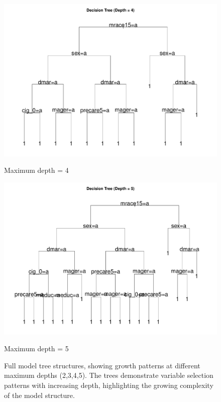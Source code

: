 \begin{figure}[p]
    \vspace{1cm}
    
    \begin{minipage}{0.48\textwidth}
        \centering
        \includegraphics[width=\linewidth]{chapters/chapter3/figures/depth/plot1/decision_tree_depth_4_2021_large.pdf}
        \caption*{Maximum depth = 4}
    \end{minipage}
    \hspace{0.02\textwidth}
    \begin{minipage}{0.48\textwidth}
        \centering
        \includegraphics[width=\linewidth]{chapters/chapter3/figures/depth/plot1/decision_tree_depth_5_2021_large.pdf}
        \caption*{Maximum depth = 5}
    \end{minipage}
    \caption{Full model tree structures, showing growth patterns at different maximum depths (2,3,4,5). The trees demonstrate variable selection patterns with increasing depth, highlighting the growing complexity of the model structure.}
    \label{fig:trees-comparison-full}
\end{figure}

